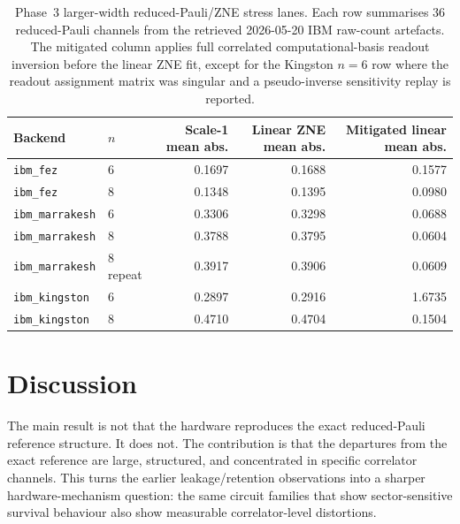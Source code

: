 \documentclass[preprint,aps,physrev,superscriptaddress,floatfix,longbibliography]{revtex4-2}
\begin{document}
\begin{table}[tb]
\centering
\small
\begin{tabular}{llrrr}
\toprule
Backend & $n$ & Scale-1 mean abs. & Linear ZNE mean abs. & Mitigated linear mean abs. \\
\midrule
\texttt{ibm\_fez} & 6 & 0.1697 & 0.1688 & 0.1577 \\
\texttt{ibm\_fez} & 8 & 0.1348 & 0.1395 & 0.0980 \\
\texttt{ibm\_marrakesh} & 6 & 0.3306 & 0.3298 & 0.0688 \\
\texttt{ibm\_marrakesh} & 8 & 0.3788 & 0.3795 & 0.0604 \\
\texttt{ibm\_marrakesh} & 8 repeat & 0.3917 & 0.3906 & 0.0609 \\
\texttt{ibm\_kingston} & 6 & 0.2897 & 0.2916 & 1.6735 \\
\texttt{ibm\_kingston} & 8 & 0.4710 & 0.4704 & 0.1504 \\
\bottomrule
\end{tabular}
\caption{Phase~3 larger-width reduced-Pauli/ZNE stress lanes. Each row
summarises 36 reduced-Pauli channels from the retrieved 2026-05-20 IBM
raw-count artefacts. The mitigated column applies full correlated
computational-basis readout inversion before the linear ZNE fit, except for
the Kingston $n=6$ row where the readout assignment matrix was singular and a
pseudo-inverse sensitivity replay is reported.}
\label{tab:phase3large}
\end{table}

\section{Discussion}

The main result is not that the hardware reproduces the exact reduced-Pauli
reference structure. It does not. The contribution is that the departures from
the exact reference are large, structured, and concentrated in specific
correlator channels. This turns the earlier leakage/retention observations
into a sharper hardware-mechanism question: the same circuit families that show
sector-sensitive survival behaviour also show measurable correlator-level
distortions.
\end{document}
